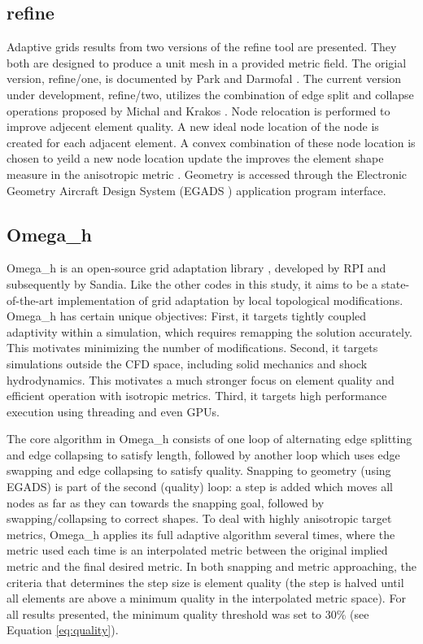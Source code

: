 \documentclass[3p,times,procedia,number]{elsarticle}
\begin{document}
\subsection{refine}

Adaptive grids results from two versions of the refine tool are presented.
They both are designed to produce a
unit mesh \cite{loseille-alauzet-siamjna-2011-cont-mesh-framework-1}
in a provided metric field.
The origial version, refine/one, is documented
by Park and Darmofal \cite{park-darmofal-parallel-aniso-adapt-aiaa}.
The current version under development, refine/two,
utilizes the combination of edge split and collapse operations
proposed by Michal and Krakos \cite{michal-krakos-aniso-adapt-edge}.
Node relocation is performed to improve adjecent element quality.
A new ideal node location of the node is created
for each adjacent element.
A convex combination of these node location is chosen
to yeild a new node location update the improves
the element shape measure in the anisotropic
metric \cite{alauzet-topology-moving-mesh}.
Geometry is accessed through the
Electronic Geometry Aircraft Design System
(EGADS \cite{haimes-drela-egads})
application program interface.

\subsection{Omega\_h}

Omega\_h is an open-source grid adaptation library
\cite{ibanez-phd-thesis-heterogeneous-adapt,
ibanez-shephard-moving-shared-mem,
omega_h-website}, developed by RPI and subsequently by Sandia.
Like the other codes in this study, it aims to be a state-of-the-art
implementation of grid adaptation by local topological modifications.
Omega\_h has certain unique objectives:
First, it targets tightly coupled adaptivity within a simulation,
which requires remapping the solution accurately.
This motivates minimizing the number of modifications.
Second, it targets simulations outside the CFD space, including
solid mechanics and shock hydrodynamics.
This motivates a much stronger focus on element quality
and efficient operation with isotropic metrics.
Third, it targets high performance execution using threading
and even GPUs.

The core algorithm in Omega\_h consists of one loop of alternating
edge splitting and edge collapsing to satisfy length, followed by another loop
which uses edge swapping and edge collapsing to satisfy quality.
Snapping to geometry (using EGADS) is part of the second (quality) loop:
a step is added which moves all nodes as far as they can towards
the snapping goal, followed by swapping/collapsing to correct shapes.
To deal with highly anisotropic target metrics, Omega\_h applies
its full adaptive algorithm several times, where the metric used
each time is an interpolated metric between the original implied metric
and the final desired metric.
In both snapping and metric approaching, the criteria that determines
the step size is element quality (the step is halved until all elements
are above a minimum quality in the interpolated metric space).
For all results presented, the minimum quality threshold was set to 30\%
(see Equation \ref{eq:quality}).
\end{document}
